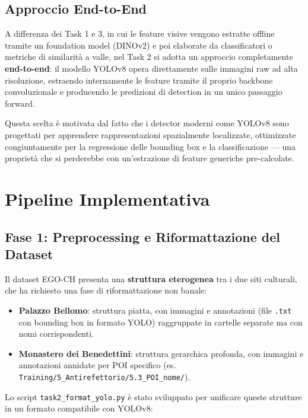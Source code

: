 \documentclass[a4paper,12pt]{report}
\begin{document}
\subsection{Approccio End-to-End}

A differenza dei Task 1 e 3, in cui le feature visive vengono estratte offline tramite un foundation model (DINOv2) e poi elaborate da classificatori o metriche di similarità a valle, nel Task 2 si adotta un approccio completamente \textbf{end-to-end}: il modello YOLOv8 opera direttamente sulle immagini raw ad alta risoluzione, estraendo internamente le feature tramite il proprio backbone convoluzionale e producendo le predizioni di detection in un unico passaggio forward.

Questa scelta è motivata dal fatto che i detector moderni come YOLOv8 sono progettati per apprendere rappresentazioni spazialmente localizzate, ottimizzate congiuntamente per la regressione delle bounding box e la classificazione --- una proprietà che si perderebbe con un'estrazione di feature generiche pre-calcolate.

\section{Pipeline Implementativa}

\subsection{Fase 1: Preprocessing e Riformattazione del Dataset}
\label{sec:formatting}

Il dataset EGO-CH presenta una \textbf{struttura eterogenea} tra i due siti culturali, che ha richiesto una fase di riformattazione non banale:

\begin{itemize}
    \item \textbf{Palazzo Bellomo}: struttura piatta, con immagini e annotazioni (file \texttt{.txt} con bounding box in formato YOLO) raggruppate in cartelle separate ma con nomi corrispondenti.
    \item \textbf{Monastero dei Benedettini}: struttura gerarchica profonda, con immagini e annotazioni annidate per POI specifico (es. \texttt{Training/5\_Antirefettorio/5.3\_POI\_nome/}).
\end{itemize}

Lo script \texttt{task2\_format\_yolo.py} è stato sviluppato per unificare queste strutture in un formato compatibile con YOLOv8:
\end{document}
